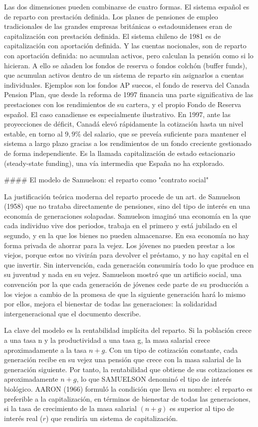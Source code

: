 \documentclass[10pt,a4paper]{article}
\begin{document}
Las dos dimensiones pueden combinarse de cuatro formas. El sistema español es de reparto con prestación definida. Los planes de pensiones de empleo tradicionales de las grandes empresas británicas o estadounidenses eran de capitalización con prestación definida. El sistema chileno de 1981 es de capitalización con aportación definida. Y las cuentas nocionales, son de reparto con aportación definida: no acumulan activos, pero calculan la pensión como si lo hicieran. A ello se añaden los fondos de reserva o fondos colchón (buffer funds), que acumulan activos dentro de un sistema de reparto sin asignarlos a cuentas individuales. Ejemplos son los fondos AP suecos, el fondo de reserva del Canada Pension Plan, que desde la reforma de 1997 financia una parte significativa de las prestaciones con los rendimientos de su cartera, y el propio Fondo de Reserva español. El caso canadiense es especialmente ilustrativo. En 1997, ante las proyecciones de déficit, Canadá elevó rápidamente la cotización hasta un nivel estable, en torno al $9,9\%$ del salario, que se preveía suficiente para mantener el sistema a largo plazo gracias a los rendimientos de un fondo creciente gestionado de forma independiente. Es la llamada capitalización de estado estacionario (steady-state funding), una vía intermedia que España no ha explorado.

#### El modelo de Samuelson: el reparto como "contrato social"

La justificación teórica moderna del reparto procede de un art. de Samuelson (1958) que no trataba directamente de pensiones, sino del tipo de interés en una economía de generaciones solapadas. Samuelson imaginó una economía en la que cada individuo vive dos periodos, trabaja en el primero y está jubilado en el segundo, y en la que los bienes no pueden almacenarse. En esa economía no hay forma privada de ahorrar para la vejez. Los jóvenes no pueden prestar a los viejos, porque estos no vivirán para devolver el préstamo, y no hay capital en el que invertir. Sin intervención, cada generación consumiría todo lo que produce en su juventud y nada en su vejez. Samuelson mostró que un artificio social, una convención por la que cada generación de jóvenes cede parte de su producción a los viejos a cambio de la promesa de que la siguiente generación hará lo mismo por ellos, mejora el bienestar de todas las generaciones: la solidaridad intergeneracional que el documento describe.

La clave del modelo es la rentabilidad implícita del reparto. Si la población crece a una tasa n y la productividad a una tasa g, la masa salarial crece aproximadamente a la tasa $n + g$. Con un tipo de cotización constante, cada generación recibe en su vejez una pensión que crece con la masa salarial de la generación siguiente. Por tanto, la rentabilidad que obtiene de sus cotizaciones es aproximadamente $n + g$, lo que SAMUELSON denominó el tipo de interés biológico. AARON (1966) formuló la condición que lleva su nombre: el reparto es preferible a la capitalización, en términos de bienestar de todas las generaciones, si la tasa de crecimiento de la masa salarial $(n + g)$ es superior al tipo de interés real ($r$) que rendiría un sistema de capitalización.
\end{document}
